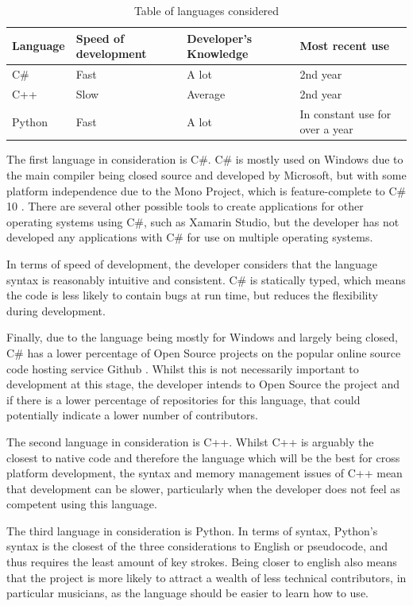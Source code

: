 \begin{table}[H]
\centering
\begin{tabular}{| l | l | l | l |} \hline
  {Language} & {Speed of development} & {Developer's Knowledge} & {Most recent use} \\ \hline
  C\# & Fast & A lot & 2nd year \\ \hline
  C++ & Slow & Average & 2nd year \\ \hline
  Python & Fast & A lot & In constant use for over a year \\ \hline
  
\end{tabular}
\caption{Table of languages considered}
\label{table:langs}
\end{table}
The first language in consideration is C\#. C\# is mostly used on Windows due to the main compiler being closed source and developed by Microsoft, but with some platform independence due to the Mono Project, which is feature-complete to C\# 10 \parencite{MonoDev}. There are several other possible tools to create applications for other operating systems using C\#, such as Xamarin Studio, but the developer has not developed any applications with C\# for use on multiple operating systems. 

In terms of speed of development, the developer considers that the language syntax is reasonably intuitive and consistent. C\# is statically typed, which means the code is less likely to contain bugs at run time, but reduces the flexibility during development.

Finally, due to the language being mostly for Windows and largely being closed, C\# has a lower percentage of Open Source projects on the popular online source code hosting service Github \parencite{Redmonk}. Whilst this is not necessarily important to development at this stage, the developer intends to Open Source the project and if there is a lower percentage of repositories for this language, that could potentially indicate a lower number of contributors.

The second language in consideration is C++. Whilst C++ is arguably the closest to native code and therefore the language which will be the best for cross platform development, the syntax and memory management issues of C++ mean that development can be slower, particularly when the developer does not feel as competent using this language.

The third language in consideration is Python. In terms of syntax, Python's syntax is the closest of the three considerations to English or pseudocode, and thus requires the least amount of key strokes. Being closer to english also means that the project is more likely to attract a wealth of less technical contributors, in particular musicians, as the language should be easier to learn how to use.

